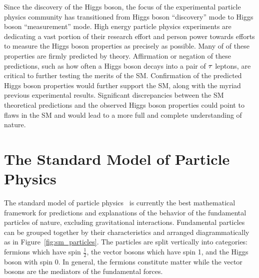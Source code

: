 Since the discovery of the Higgs boson, the focus of the experimental particle physics community has transitioned from
Higgs boson ``discovery'' mode to Higgs boson ``measurement'' mode. High energy particle physics experiments
are dedicating a vast portion of their research effort and person power towards
efforts to measure the Higgs boson properties as precisely as possible. Many 
of of these properties are firmly predicted by theory. Affirmation or negation of these predictions,
such as how often a Higgs boson decays into a pair of $\tau$ leptons,
are critical to further testing the merits of the SM. Confirmation of the
predicted Higgs boson properties would further support the SM, along with the myriad previous
experimental results. Significant discrepancies between the SM
theoretical predictions and the observed Higgs boson properties could point to
flaws in the SM and would lead to a more full and complete understanding of nature.




\section{The Standard Model of Particle Physics}
The standard model of particle physics~\cite{Glashow:1961tr,SM1,SM3} is currently
the best mathematical framework for predictions and explanations of the behavior
of the fundamental particles of nature, excluding gravitational interactions. Fundamental particles can be grouped
together by their characteristics and arranged diagrammatically as in
Figure~\ref{fig:sm_particles}. The particles are split vertically into categories:
fermions which have spin $\frac{1}{2}$, the vector bosons which have spin 1, and
the Higgs boson with spin 0. In general, the fermions constitute 
matter while the vector bosons are the mediators of the fundamental forces.

